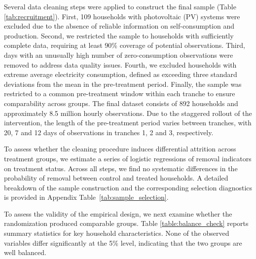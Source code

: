 Several data cleaning steps were applied to construct the final sample (Table \ref{tab:recruitment}). First, 109 households with photovoltaic (PV) systems were excluded due to the absence of reliable information on self-consumption and production. Second, we restricted the sample to households with sufficiently complete data, requiring at least 90\% coverage of potential observations. Third, days with an unusually high number of zero-consumption observations were removed to address data quality issues. Fourth, we excluded households with extreme average electricity consumption, defined as exceeding three standard deviations from the mean in the pre-treatment period. Finally, the sample was restricted to a common pre-treatment window within each tranche to ensure comparability across groups. The final dataset consists of 892 households and approximately 8.5 million hourly observations. Due to the staggered rollout of the intervention, the length of the pre-treatment period varies between tranches, with 20, 7 and 12 days of observations in tranches 1, 2 and 3, respectively.

To assess whether the cleaning procedure induces differential attrition across treatment groups, we estimate a series of logistic regressions of removal indicators on treatment status. Across all steps, we find no systematic differences in the probability of removal between control and treated households. A detailed breakdown of the sample construction and the corresponding selection diagnostics is provided in Appendix Table~\ref{tab:sample_selection}.

To assess the validity of the empirical design, we next examine whether the randomization produced comparable groups. Table \ref{table:balance_check} reports summary statistics for key household characteristics. None of the observed variables differ significantly at the 5\% level, indicating that the two groups are well balanced.

